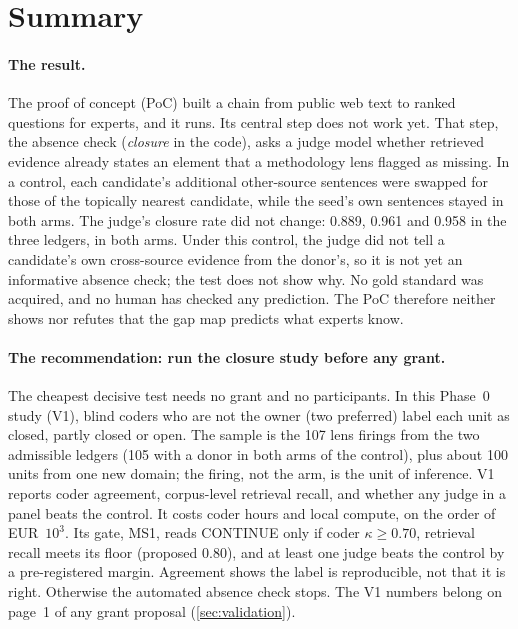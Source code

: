 \section{Summary}\label{sec:summary}

\paragraph{The result.} \evobs{} The proof of concept (PoC) built a chain from public web text to
ranked questions for experts, and it runs. Its central step does not work yet. That step, the
absence check (\emph{closure} in the code), asks a judge model whether retrieved evidence already
states an element that a methodology lens flagged as missing. In a control, each candidate's
additional other-source sentences were swapped for those of the topically nearest candidate, while the
seed's own sentences stayed in both arms. The judge's closure rate did not change: 0.889, 0.961 and
0.958 in the three ledgers, in both arms. Under this control, the judge did not tell a candidate's own
cross-source evidence from the donor's, so it is not yet an informative absence check; the test does
not show why. No gold standard was acquired, and no human has checked any prediction. The PoC therefore
neither shows nor refutes that the gap map predicts what experts know.

\paragraph{The recommendation: run the closure study before any grant.} \evfut{} The cheapest
decisive test needs no grant and no participants. In this Phase~0 study (V1), blind coders who are not
the owner (two preferred) label each unit as closed, partly closed or open. The sample is the 107 lens firings from the two admissible ledgers (105 with a donor in both arms of the control), plus about 100 units from
one new domain; the firing, not the arm, is the unit of inference. V1 reports coder agreement,
corpus-level retrieval recall, and whether any judge in a panel beats the control. It costs coder hours
and local compute, on the order of EUR~$10^3$. Its gate, MS1, reads CONTINUE only if coder
$\kappa \geq 0.70$, retrieval recall meets its floor (proposed 0.80), and at least one judge beats the
control by a pre-registered margin. Agreement shows the label is reproducible, not that it is right.
Otherwise the automated absence check stops. The V1 numbers belong on page~1 of any grant proposal
(\cref{sec:validation}).

